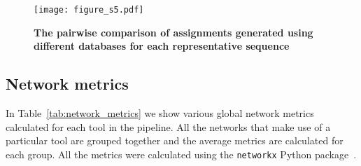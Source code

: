     \begin{figure}[H]
      \centering
      \texttt{[image: figure\_s5.pdf]}
    \end{figure}
    \begin{figure}[H]
      \centering
        \caption{
          \textbf{The pairwise comparison of assignments generated using different databases for each representative sequence}
        }
      \label{fig:figure_s5}
    \end{figure}
    \FloatBarrier
    \newpage

  \subsection*{Network metrics}

  In Table~\ref{tab:network_metrics} we show various global network metrics calculated for each tool in the pipeline.
  All the networks that make use of a particular tool are grouped together and the average metrics are calculated for each group.
  All the metrics were calculated using the \texttt{networkx} Python package~\cite{hagbergExploringNetworkStructure2008}.
